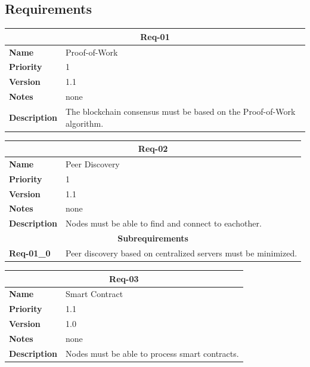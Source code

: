 \documentclass[../documentation.tex]{subfiles}
\begin{document}
\subsection{Requirements}

\bgroup{}
\def\arraystretch{1.25}
\begin{center}
    \begin{tabular}{ |l|p{9cm}| }
        \hline
        \multicolumn{2}{|c|}{\textbf{Req-01}} \\
        \hline
        \textbf{Name} & Proof-of-Work \\
        \hline
        \textbf{Priority} & 1 \\
        \hline
        \textbf{Version} & 1.1 \\
        \hline
        \textbf{Notes} & none \\
        \hline
        \textbf{Description} & The blockchain consensus must be based on the Proof-of-Work algorithm. \\
        \hline
    \end{tabular}
\end{center}
\egroup{}

\bgroup{}
\def\arraystretch{1.25}
\begin{center}
    \begin{tabular}{ |l|p{9cm}| }
        \hline
        \multicolumn{2}{|c|}{\textbf{Req-02}} \\
        \hline
        \textbf{Name} & Peer Discovery \\
        \hline
        \textbf{Priority} & 1 \\
        \hline
        \textbf{Version} & 1.1 \\
        \hline
        \textbf{Notes} & none \\
        \hline
        \textbf{Description} & Nodes must be able to find and connect to eachother. \\
        \hline
        \multicolumn{2}{|c|}{\textbf{Subrequirements}} \\
        \hline
        \textbf{Req-01\_0} & Peer discovery based on centralized servers must be minimized. \\
        \hline
    \end{tabular}
\end{center}
\egroup{}

\bgroup{}
\def\arraystretch{1.25}
\begin{center}
    \begin{tabular}{ |l|p{9cm}| }
        \hline
        \multicolumn{2}{|c|}{\textbf{Req-03}} \\
        \hline
        \textbf{Name} & Smart Contract \\
        \hline
        \textbf{Priority} & 1.1 \\
        \hline
        \textbf{Version} & 1.0 \\
        \hline
        \textbf{Notes} & none \\
        \hline
        \textbf{Description} & Nodes must be able to process smart contracts. \\
        \hline
    \end{tabular}
\end{center}
\egroup{}
\end{document}
